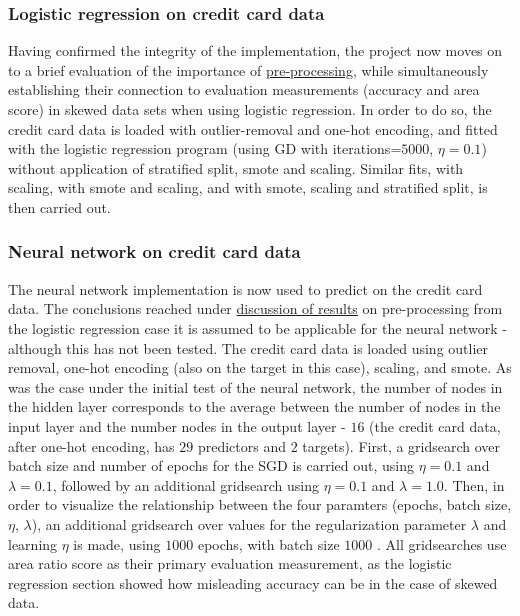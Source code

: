 \documentclass[%
oneside,                 %
final,                   %
10pt]{article}
\begin{document}
\subsubsection{Logistic regression on credit card data} \label{CC_logreg}
Having confirmed the integrity of the implementation, the project now moves on to a brief evaluation of the importance of \hyperref[Section_M_PP]{pre-processing}, while simultaneously establishing their connection to evaluation measurements (accuracy and area score) in skewed data sets when using logistic regression. In order to do so, the credit card data is loaded with outlier-removal and one-hot encoding, and fitted with the logistic regression program (using GD with iterations=$5000$, $\eta=0.1$) without application of stratified split, smote and scaling. Similar fits, with scaling, with smote and scaling, and with smote, scaling and stratified split, is then carried out.

\subsubsection{Neural network on credit card data}\label{CC_NN}
The neural network implementation is now used to predict on the credit card data. The conclusions reached under \hyperref[Section_Discussion_of_results]{discussion of results} on pre-processing from the logistic regression case it is assumed to be applicable for the neural network - although this has not been tested. The credit card data is loaded using outlier removal, one-hot encoding (also on the target in this case), scaling,  and smote. As was the case under the initial test of the neural network, the number of nodes in the hidden layer corresponds to the average between the number of nodes in the input layer and the number nodes in the output layer - $16$ (the credit card data, after one-hot encoding, has $29$ predictors and $2$ targets). First, a gridsearch over batch size and number of epochs for the SGD is carried out, using $\eta=0.1$ and $\lambda=0.1$, followed by an additional gridsearch using $\eta=0.1$ and $\lambda=1.0$. Then, in order to visualize the relationship between the four paramters (epochs, batch size, $\eta$, $\lambda$), an additional gridsearch over values for the regularization parameter $\lambda$ and learning $\eta$ is made, using $1000$ epochs, with batch size $1000$ . All gridsearches use area ratio score as their primary evaluation measurement, as the logistic regression section showed how misleading accuracy can be in the case of skewed data.
\end{document}
